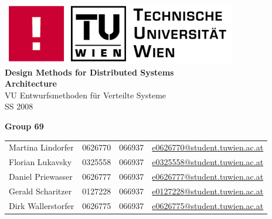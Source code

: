 \documentclass[a4paper]{article}
\begin{document}
\begin{titlepage}
	\bigskip
	\bigskip
	\bigskip
	\begin{center}
		\includegraphics{informatik-tuwien.png}\\
		\vspace{1cm}
		\Huge{\textsf{\textbf{Design Methods for Distributed Systems\\}}}
		\vspace{1cm}
		\huge{\textsf{\textbf{Architecture\\}}}
		\vspace{1cm}
		\LARGE{\textsf{VU Entwurfsmethoden f\"{u}r Verteilte Systeme\\}}
		\vspace{1cm}
		\Large{\textsf{SS 2008\\}}
	\end{center}
	\vfill
	\begin{center}
		\large{\textsf{\textbf{Group 69}}}
	\end{center}
	\begin{tabular}{llll}
	\textsf{Martina Lindorfer} & \textsf{0626770} & \textsf{066937} & \url{e0626770@student.tuwien.ac.at}\\
	\textsf{Florian Lukavsky} & \textsf{0325558} & \textsf{066937} & \url{e0325558@student.tuwien.ac.at}\\
	\textsf{Daniel Priewasser} & \textsf{0626777} & \textsf{066937} & \url{e0626777@student.tuwien.ac.at}\\
	\textsf{Gerald Scharitzer} & \textsf{0127228} & \textsf{066937} & \url{e0127228@student.tuwien.ac.at}\\
	\textsf{Dirk Wallerstorfer} & \textsf{0626775} & \textsf{066937} & \url{e0626775@student.tuwien.ac.at}\\
	\end{tabular}
\end{titlepage}

\clearpage

\pagestyle{fancy}				
\fancyfoot{}
\tableofcontents

\newpage
\end{document}
